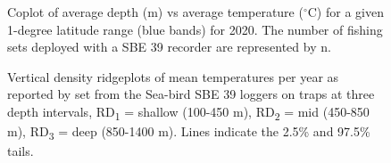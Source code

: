 \documentclass[12pt]{article}\usepackage[]{graphicx}\usepackage[]{color}
\begin{document}
\begin{figure}[htb]

{\centering {} 

}

\caption{Coplot of average depth (m) vs average temperature (\(^\circ\)C) for a given 1-degree latitude range (blue bands) for 2020. The number of fishing sets deployed with a SBE 39 recorder are represented by n.}\label{fig:figure15}
\end{figure}
\clearpage


\begin{figure}[htb]

{\centering {} 

}

\caption{Vertical density ridgeplots of mean temperatures per year as reported by set from the Sea-bird SBE 39 loggers on traps at three depth intervals, RD\textsubscript{1} = shallow (100-450 m), RD\textsubscript{2} = mid (450-850 m), RD\textsubscript{3} = deep (850-1400 m). Lines indicate the 2.5\% and 97.5\% tails.}\label{fig:figure16}
\end{figure}
\clearpage
\end{document}
